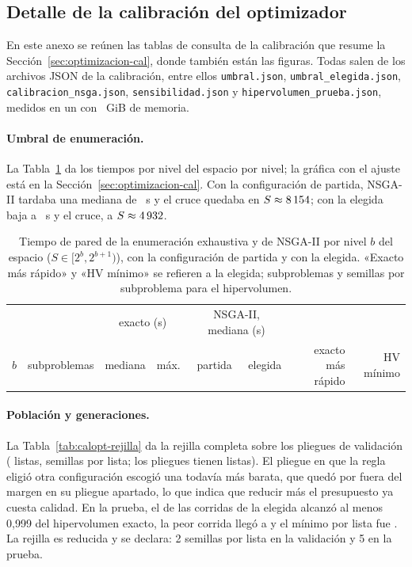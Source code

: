 \subsection{Detalle de la calibración del optimizador}
\label{anx:calibracion}

\sloppy En este anexo se reúnen las tablas de consulta de la calibración que resume la
Sección~\ref{sec:optimizacion-cal}, donde también están las figuras. Todas salen de los archivos JSON de la calibración,
entre ellos \texttt{umbral.json}, \texttt{umbral\_elegida.json}, \texttt{calibracion\_nsga.json}, \texttt{sensibilidad.json} y \texttt{hipervolumen\_prueba.json}, medidos en un \calCPU{} con
\calRAM~GiB de memoria.

\paragraph{Umbral de enumeración.} La Tabla~\ref{tab:calopt-umbral} da los tiempos por nivel del
espacio por nivel; la gráfica con el ajuste está en la Sección~\ref{sec:optimizacion-cal}. Con la configuración
de partida, NSGA-II tardaba una mediana de \calTNsgaMediana~s y el cruce quedaba en
$S\approx8\,154$; con la elegida baja a \calTNsgaElegidaMediana~s y el cruce, a
$S\approx4\,932$.

\begin{table}[htbp]
\centering
\caption{Tiempo de pared de la enumeración exhaustiva y de NSGA-II por nivel $b$ del espacio
($S\in[2^b,2^{b+1})$), con la configuración de partida y con la elegida. «Exacto más rápido» y
«HV mínimo» se refieren a la elegida; \calSubproblemas{} subproblemas y \calSemillasHV{} semillas por
subproblema para el hipervolumen.}
\label{tab:calopt-umbral}
\small
\begin{tabular}{rrrrrrrr}
\toprule
 & & \multicolumn{2}{c}{exacto (s)} & \multicolumn{2}{c}{NSGA-II, mediana (s)} & & \\
$b$ & subproblemas & mediana & máx. & partida & elegida & exacto más rápido & HV mínimo \\
\midrule

\end{tabular}
\end{table}

\paragraph{Población y generaciones.} La Tabla~\ref{tab:calopt-rejilla} da la rejilla completa sobre
los pliegues de validación (\calCVListas{} listas, \calSemillasCV{} semillas por lista; los pliegues
tienen \calPlieguesListas{} listas). El pliegue en
que la regla eligió otra configuración escogió una todavía más barata, que quedó por fuera del margen
en su pliegue apartado, lo que indica que reducir más el presupuesto ya cuesta calidad. En la prueba,
el \calFraccionHV{} de las corridas de la elegida alcanzó al menos 0,999 del hipervolumen exacto, la
peor corrida llegó a \calRazonMinPrueba{} y el mínimo por lista fue \calPruebaElegidaHVMin. La rejilla
es reducida y se declara: 2 semillas por lista en la validación y 5 en la prueba.

